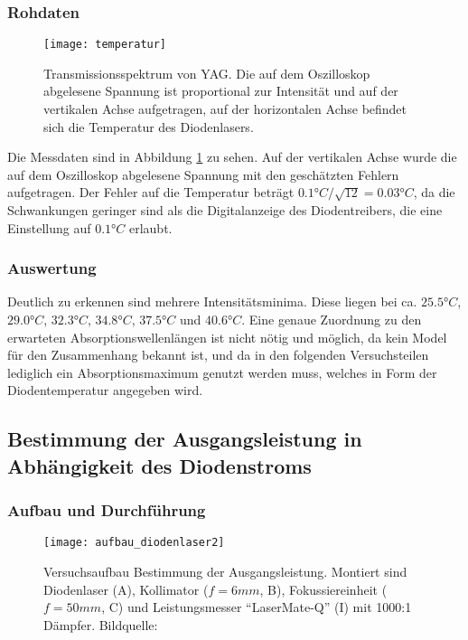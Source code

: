 \documentclass{../Misc/MontavonLaTeX/Montavon}
\newcommand{\halfwidth}{0.48\textwidth}
\newcommand{\fullwidth}{1.0\textwidth}
\begin{document}
\subsubsection{Rohdaten}
\begin{figure}[htbp]
\centering
\texttt{[image: temperatur]}
\caption{Transmissionsspektrum von YAG. Die auf dem Oszilloskop abgelesene Spannung ist proportional zur Intensität und auf der vertikalen Achse aufgetragen, auf der horizontalen Achse befindet sich die Temperatur des Diodenlasers.}
\label{fig:temperatur}
\end{figure}

Die Messdaten sind in Abbildung \ref{fig:temperatur} zu sehen. Auf der vertikalen Achse wurde die auf dem Oszilloskop abgelesene Spannung mit den geschätzten Fehlern aufgetragen. Der Fehler auf die Temperatur beträgt $0.1 \unit{\degree C} / \sqrt{12} = 0.03 \unit{\degree C}$, da die Schwankungen geringer sind als die Digitalanzeige des Diodentreibers, die eine Einstellung auf $0.1 \unit{\degree C}$ erlaubt.

\subsubsection{Auswertung}
Deutlich zu erkennen sind mehrere Intensitätsminima. Diese liegen bei ca. $25.5 \unit{\degree C}$, $29.0 \unit{\degree C}$, $32.3 \unit{\degree C}$, $34.8 \unit{\degree C}$, $37.5 \unit{\degree C}$ und $40.6 \unit{\degree C}$. Eine genaue Zuordnung zu den erwarteten Absorptionswellenlängen ist nicht nötig und möglich, da kein Model für den Zusammenhang bekannt ist, und da in den folgenden Versuchsteilen lediglich ein Absorptionsmaximum genutzt werden muss, welches in Form der Diodentemperatur angegeben wird.

\subsection{Bestimmung der Ausgangsleistung in Abhängigkeit des Diodenstroms}

\subsubsection{Aufbau und Durchführung}
\begin{figure}[htbp]
\centering
\texttt{[image: aufbau\_diodenlaser2]}
\caption{Versuchsaufbau Bestimmung der Ausgangsleistung. Montiert sind Diodenlaser (A), Kollimator ($f = 6 \unit{mm}$, B), Fokussiereinheit ($f = 50 \unit{mm}$, C) und Leistungsmesser \enquote{LaserMate-Q} (I) mit 1000:1 Dämpfer. Bildquelle: \cite[S. 35]{anleitung1}}
\label{fig:aufbau_diodenlaser2}
\end{figure}
\end{document}
